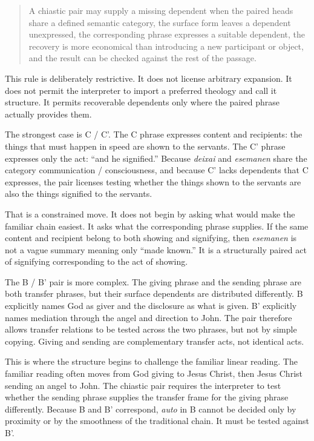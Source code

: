 \begin{quote}
A chiastic pair may supply a missing dependent when the paired heads share a defined semantic category, the surface form leaves a dependent unexpressed, the corresponding phrase expresses a suitable dependent, the recovery is more economical than introducing a new participant or object, and the result can be checked against the rest of the passage.
\end{quote}

This rule is deliberately restrictive. It does not license arbitrary expansion. It does not permit the interpreter to import a preferred theology and call it structure. It permits recoverable dependents only where the paired phrase actually provides them.

The strongest case is C / C'. The C phrase expresses content and recipients: the things that must happen in speed are shown to the servants. The C' phrase expresses only the act: ``and he signified.'' Because \textit{deixai} and \textit{esemanen} share the category communication / consciousness, and because C' lacks dependents that C expresses, the pair licenses testing whether the things shown to the servants are also the things signified to the servants.

That is a constrained move. It does not begin by asking what would make the familiar chain easiest. It asks what the corresponding phrase supplies. If the same content and recipient belong to both showing and signifying, then \textit{esemanen} is not a vague summary meaning only ``made known.'' It is a structurally paired act of signifying corresponding to the act of showing.

The B / B' pair is more complex. The giving phrase and the sending phrase are both transfer phrases, but their surface dependents are distributed differently. B explicitly names God as giver and the disclosure as what is given. B' explicitly names mediation through the angel and direction to John. The pair therefore allows transfer relations to be tested across the two phrases, but not by simple copying. Giving and sending are complementary transfer acts, not identical acts.

This is where the structure begins to challenge the familiar linear reading. The familiar reading often moves from God giving to Jesus Christ, then Jesus Christ sending an angel to John. The chiastic pair requires the interpreter to test whether the sending phrase supplies the transfer frame for the giving phrase differently. Because B and B' correspond, \textit{auto} in B cannot be decided only by proximity or by the smoothness of the traditional chain. It must be tested against B'.

